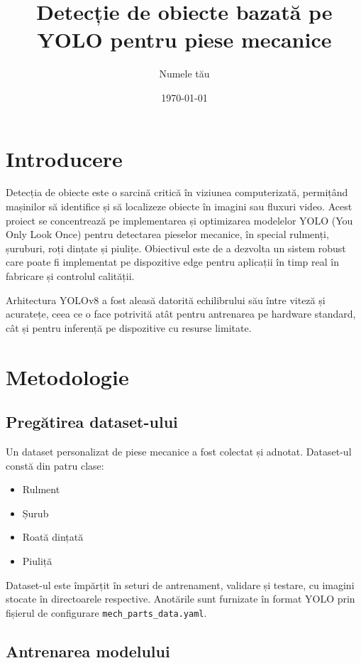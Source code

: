 \documentclass[12pt,a4paper]{article}
\title{Detecție de obiecte bazată pe YOLO pentru piese mecanice}
\author{Numele tău}
\date{\today}
\begin{document}
\maketitle

\section{Introducere}

Detecția de obiecte este o sarcină critică în viziunea computerizată, permițând mașinilor să identifice și să localizeze obiecte în imagini sau fluxuri video. Acest proiect se concentrează pe implementarea și optimizarea modelelor YOLO (You Only Look Once) pentru detectarea pieselor mecanice, în special rulmenți, șuruburi, roți dințate și piulițe. Obiectivul este de a dezvolta un sistem robust care poate fi implementat pe dispozitive edge pentru aplicații în timp real în fabricare și controlul calității.

Arhitectura YOLOv8 a fost aleasă datorită echilibrului său între viteză și acuratețe, ceea ce o face potrivită atât pentru antrenarea pe hardware standard, cât și pentru inferență pe dispozitive cu resurse limitate.

\section{Metodologie}

\subsection{Pregătirea dataset-ului}

Un dataset personalizat de piese mecanice a fost colectat și adnotat. Dataset-ul constă din patru clase:
\begin{itemize}
\item Rulment
\item Șurub
\item Roată dințată
\item Piuliță
\end{itemize}

Dataset-ul este împărțit în seturi de antrenament, validare și testare, cu imagini stocate în directoarele respective. Anotările sunt furnizate în format YOLO prin fișierul de configurare \texttt{mech\_parts\_data.yaml}.

\subsection{Antrenarea modelului}
\end{document}

